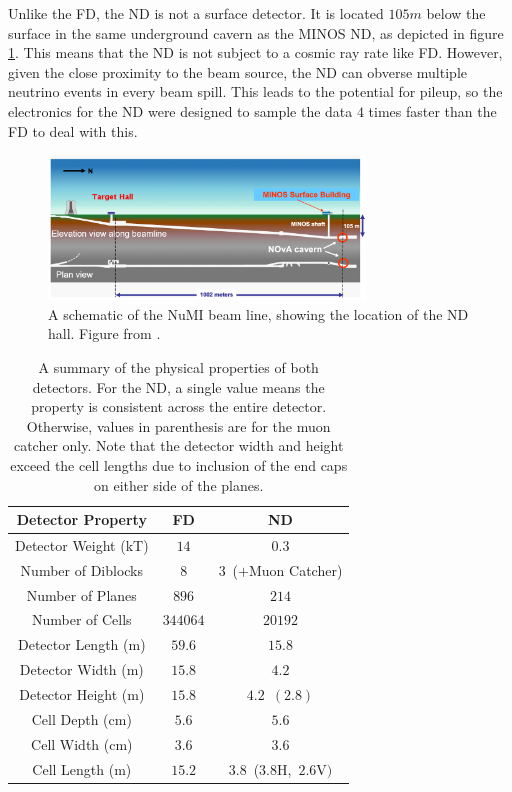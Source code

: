 Unlike the FD, the ND is not a surface detector. It is located $105\unit{m}$ below the surface in the same underground cavern as the MINOS ND, as depicted in figure \ref{fig:DetNDPlan}. This means that the ND is not subject to a cosmic ray rate like FD. However, given the close proximity to the beam source, the ND can obverse multiple neutrino events in every beam spill. This leads to the potential for pileup, so the electronics for the ND were designed to sample the data $4$ times faster than the FD to deal with this.
\begin{figure}[htb]
  \centering
  \includegraphics[width=0.75\textwidth]{figures/DetNDPlan.png}
  \caption[Schematic of the NuMI Beam line]{A schematic of the NuMI beam line, showing the location of the ND hall. Figure from \cite{ref:TDRNOvA}.}
  \label{fig:DetNDPlan}
\end{figure}

\begin{table}[htb]
  \begin{center}
    \caption[Detector Properties]{A summary of the physical properties of both detectors. For the ND, a single value means the property is consistent across the entire detector. Otherwise, values in parenthesis are for the muon catcher only. Note that the detector width and height exceed the cell lengths due to inclusion of the end caps on either side of the planes.}
    \label{tab:Dets}
    \begin{tabular}{c c c}
      \hline\hline
      Detector Property & FD & ND \\
      \hline
      Detector Weight (kT) & $14$ & $0.3$ \\
      Number of Diblocks & $8$ & $3$~(${+}$Muon Catcher) \\
      Number of Planes & $896$ & $214$ \\
      Number of Cells & $344064$ & $20192$ \\
      Detector Length (m) & $59.6$ & $15.8$ \\
      Detector Width (m) & $15.8$ & $4.2$ \\
      Detector Height (m) & $15.8$ & $4.2$~$(2.8)$ \\
      Cell Depth (cm) & $5.6$ & $5.6$ \\
      Cell Width (cm) & $3.6$ & $3.6$ \\
      Cell Length (m) & $15.2$ & $3.8$~($3.8$H,~$2.6$V$)$ \\
      \hline
    \end{tabular}
  \end{center}
\end{table}